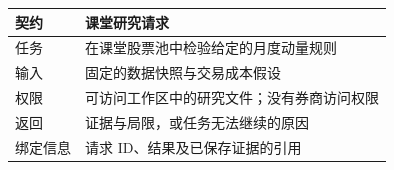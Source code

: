 \begin{tabular}{@{}P{3.0cm}P{9.5cm}@{}}
\toprule
\textbf{契约} & \textbf{课堂研究请求} \\
\midrule
任务 & 在课堂股票池中检验给定的月度动量规则 \\
输入 & 固定的数据快照与交易成本假设 \\
权限 & 可访问工作区中的研究文件；没有券商访问权限 \\
返回 & 证据与局限，或任务无法继续的原因 \\
绑定信息 & 请求 ID、结果及已保存证据的引用 \\
\bottomrule
\end{tabular}

